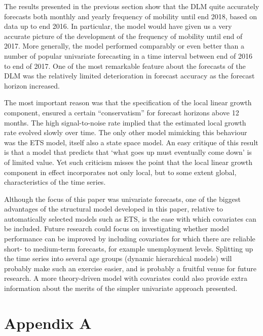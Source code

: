 \documentclass[12pt, a4paper]{article}
\begin{document}
The results presented in the previous section show that the DLM quite accurately forecasts both monthly and yearly frequency of mobility until end 2018, based on data up to end 2016. In particular, the model would have given us a very accurate picture of the development
of the frequency of mobility until end of 2017. More generally, the
model performed comparably or even better than a number of popular
univariate forecasting in a time interval between end of 2016 to end of
2017. One of the most remarkable feature about the forecasts of the DLM
was the relatively limited deterioration in forecast accuracy as the
forecast horizon increased.

The most important reason was that the specification of the local linear growth component,
ensured a certain ``conservatism'' for forecast horizons above 12
months. The high signal-to-noise rate implied that the estimated local
growth rate evolved slowly over time. The only other model mimicking
this behaviour was the ETS model, itself also a state space model. An
easy critique of this result is that a model that predicts that `what
goes up must eventually come down' is of limited value. Yet such
criticism misses the point that the local linear growth component in
effect incorporates not only local, but to some extent global,
characteristics of the time series. 

Although the focus of this paper was univariate forecasts, one of the
biggest advantages of the structural model developed in this paper,
relative to automatically selected models such as ETS, is the ease with
which covariates can be included. Future research could focus on
investigating whether model performance can be improved by including
covariates for which there are reliable short- to medium-term forecasts, for example unemployment levels. Splitting up the time series into
several age groups (dynamic hierarchical models) will probably make such
an exercise easier, and is probably a fruitful venue for future
research. A more theory-driven model with covariates could also provide
extra information about the merits of the simpler univariate approach
presented.

\renewcommand\refname{Bibliography}
\printbibliography

\section{Appendix A}\label{appendix-a}
\end{document}
